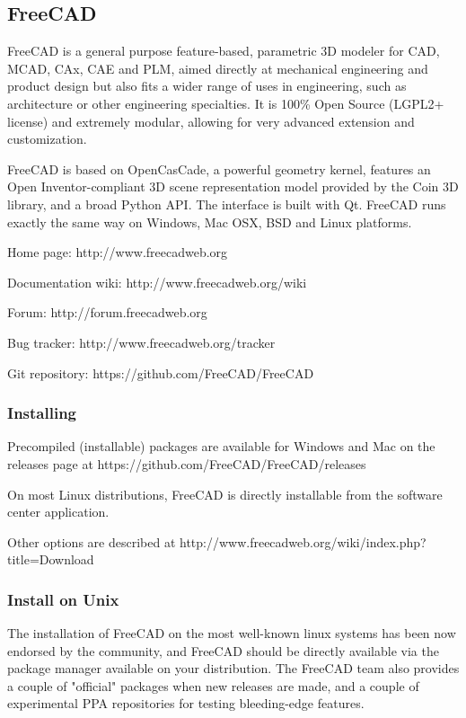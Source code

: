 \subsection{FreeCAD}
FreeCAD is a general purpose feature-based, parametric 3D modeler for CAD, MCAD, CAx, CAE and PLM, aimed directly at mechanical engineering and product design but also fits a wider range of uses in engineering, such as architecture or other engineering specialties. It is 100\% Open Source (LGPL2+ license) and extremely modular, allowing for very advanced extension and customization.

FreeCAD is based on OpenCasCade, a powerful geometry kernel, features an Open Inventor-compliant 3D scene representation model provided by the Coin 3D library, and a broad Python API. The interface is built with Qt. FreeCAD runs exactly the same way on Windows, Mac OSX, BSD and Linux platforms.

Home page: http://www.freecadweb.org

Documentation wiki: http://www.freecadweb.org/wiki

Forum: http://forum.freecadweb.org

Bug tracker: http://www.freecadweb.org/tracker

Git repository: https://github.com/FreeCAD/FreeCAD

\subsubsection{Installing}

Precompiled (installable) packages are available for Windows and Mac on the releases page at https://github.com/FreeCAD/FreeCAD/releases

On most Linux distributions, FreeCAD is directly installable from the software center application.

Other options are described at http://www.freecadweb.org/wiki/index.php?title=Download

\subsubsection{Install on Unix}
The installation of FreeCAD on the most well-known linux systems has been now endorsed by the community, and FreeCAD should be directly available via the package manager available on your distribution. The FreeCAD team also provides a couple of "official" packages when new releases are made, and a couple of experimental PPA repositories for testing bleeding-edge features.


